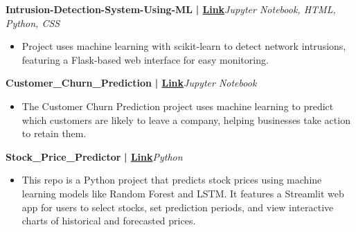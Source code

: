 \documentclass[a4paper]{article}
\begin{document}
          \vspace*{3mm}
      {\textbf{Intrusion-Detection-System-Using-ML}}\textbf{ | \href{https://github.com/SudoAnirudh/Intrusion-Detection-System-Using-ML}{Link}}\hfill{\sl Jupyter Notebook, HTML, Python, CSS}\\
          \vspace{-3mm}
\begin{itemize} \itemsep -3pt
\item[] Project uses machine learning with scikit-learn to detect network intrusions, featuring a Flask-based web interface for easy monitoring.
\end{itemize}
          \vspace*{3mm}
      {\textbf{Customer\_Churn\_Prediction}}\textbf{ | \href{https://github.com/SudoAnirudh/Customer\_Churn\_Prediction}{Link}}\hfill{\sl Jupyter Notebook}\\
          \vspace{-3mm}
\begin{itemize} \itemsep -3pt
\item[] The Customer Churn Prediction project uses machine learning to predict which customers are likely to leave a company, helping businesses take action to retain them.
\end{itemize}
          \vspace*{3mm}
      {\textbf{Stock\_Price\_Predictor}}\textbf{ | \href{https://github.com/SudoAnirudh/Stock\_Price\_Predictor}{Link}}\hfill{\sl Python}\\
          \vspace{-3mm}
\begin{itemize} \itemsep -3pt
\item[] This repo is a Python project that predicts stock prices using machine learning models like Random Forest and LSTM. It features a Streamlit web app for users to select stocks, set prediction periods, and view interactive charts of historical and forecasted prices.
\end{itemize}
          \vspace*{3mm}
\end{document}

